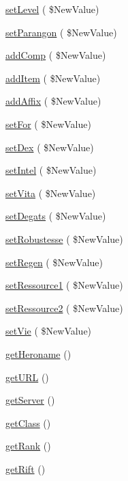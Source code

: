 \begin{DoxyCompactItemize}
\hyperlink{class_hero_a193167bb9c4a6410d44511f042660bf3}{set\+Level} ( \$New\+Value)
\item 
\hyperlink{class_hero_a610db717ebe7ad94233b86a637fca660}{set\+Parangon} ( \$New\+Value)
\item 
\hyperlink{class_hero_aad51972665b665b8bf3c7af439649197}{add\+Comp} ( \$New\+Value)
\item 
\hyperlink{class_hero_a089b98df69d37bcffa4daed4e0bde01b}{add\+Item} ( \$New\+Value)
\item 
\hyperlink{class_hero_aa6fb2135453af0ad7c16960f5d0a8412}{add\+Affix} ( \$New\+Value)
\item 
\hyperlink{class_hero_a4ecce0522ff9c6eb513531a05d7fea8a}{set\+For} ( \$New\+Value)
\item 
\hyperlink{class_hero_afc3941d527fd4cf15f6018f8b962ec0e}{set\+Dex} ( \$New\+Value)
\item 
\hyperlink{class_hero_a460f54cd686a39877ea25d4ba9ef27f2}{set\+Intel} ( \$New\+Value)
\item 
\hyperlink{class_hero_aa83218c340bb49f69ee5d537974be752}{set\+Vita} ( \$New\+Value)
\item 
\hyperlink{class_hero_a401e3a4a65354c605fa0958c725be87a}{set\+Degats} ( \$New\+Value)
\item 
\hyperlink{class_hero_abfb17e0fc088df407d18bb6a83a5ee36}{set\+Robustesse} ( \$New\+Value)
\item 
\hyperlink{class_hero_a591551873c61bc27e203eca5e4b4a989}{set\+Regen} ( \$New\+Value)
\item 
\hyperlink{class_hero_ab322ecf2edd6cec527d0d2715a1cfa1c}{set\+Ressource1} ( \$New\+Value)
\item 
\hyperlink{class_hero_a11a02ea8b3c6109f3951fac1c37288ec}{set\+Ressource2} ( \$New\+Value)
\item 
\hyperlink{class_hero_a0f2eba73b403fad9079877dd64a08e65}{set\+Vie} ( \$New\+Value)
\item 
\hyperlink{class_hero_a181fd746cd71803d86401e6dd8ac28de}{get\+Heroname} ()
\item 
\hyperlink{class_hero_a4e52b2f4e896ade773b1cedac0857f4e}{get\+U\+RL} ()
\item 
\hyperlink{class_hero_a534e160f3dabc7b45087b3ebf353acd5}{get\+Server} ()
\item 
\hyperlink{class_hero_ae8f80050c2256fc2f95c83748257210d}{get\+Class} ()
\item 
\hyperlink{class_hero_a3797e214969c182e6597efd83b8c7cc7}{get\+Rank} ()
\item 
\hyperlink{class_hero_a4936f0034a02283187e82ce677e57690}{get\+Rift} ()

\end{DoxyCompactItemize}
